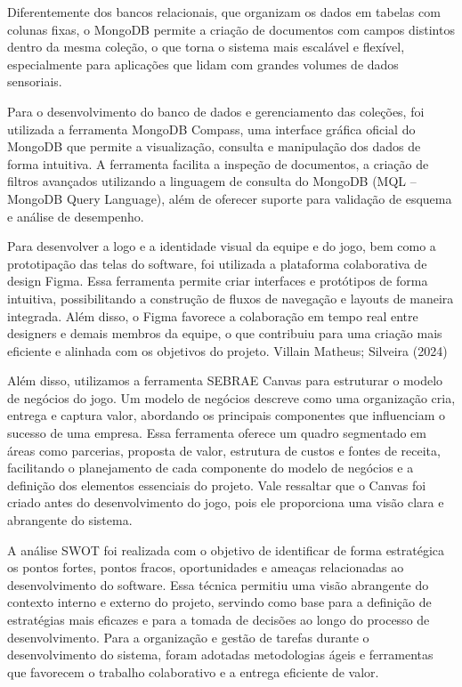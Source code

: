 Diferentemente dos bancos relacionais, que organizam os dados em tabelas com colunas
fixas, o MongoDB permite a criação de documentos com campos distintos dentro da mesma
coleção, o que torna o sistema mais escalável e flexível, especialmente para aplicações que
lidam com grandes volumes de dados sensoriais.

Para o desenvolvimento do banco de dados e gerenciamento das coleções, foi utilizada a
ferramenta MongoDB Compass, uma interface gráfica oficial do MongoDB que permite a
visualização, consulta e manipulação dos dados de forma intuitiva. A ferramenta facilita a
inspeção de documentos, a criação de filtros avançados utilizando a linguagem de consulta
do MongoDB (MQL – MongoDB Query Language), além de oferecer suporte para validação
de esquema e análise de desempenho.

Para desenvolver a logo e a identidade visual da equipe e do jogo, bem como a prototipação
das telas do software, foi utilizada a plataforma colaborativa de design Figma. Essa
ferramenta permite criar interfaces e protótipos de forma intuitiva, possibilitando a
construção de fluxos de navegação e layouts de maneira integrada. Além disso, o Figma
favorece a colaboração em tempo real entre designers e demais membros da equipe, o que
contribuiu para uma criação mais eficiente e alinhada com os objetivos do projeto. Villain
Matheus; Silveira (2024)

Além disso, utilizamos a ferramenta SEBRAE Canvas para estruturar o modelo de negócios do
jogo. Um modelo de negócios descreve como uma organização cria, entrega e captura valor,
abordando os principais componentes que influenciam o sucesso de uma empresa. Essa
ferramenta oferece um quadro segmentado em áreas como parcerias, proposta de valor,
estrutura de custos e fontes de receita, facilitando o planejamento de cada componente do
modelo de negócios e a definição dos elementos essenciais do projeto. Vale ressaltar que o
Canvas foi criado antes do desenvolvimento do jogo, pois ele proporciona uma visão clara e
abrangente do sistema.

A análise SWOT foi realizada com o objetivo de identificar de forma estratégica os pontos
fortes, pontos fracos, oportunidades e ameaças relacionadas ao desenvolvimento do
software. Essa técnica permitiu uma visão abrangente do contexto interno e externo do
projeto, servindo como base para a definição de estratégias mais eficazes e para a tomada
de decisões ao longo do processo de desenvolvimento.
Para a organização e gestão de tarefas durante o desenvolvimento do sistema, foram
adotadas metodologias ágeis e ferramentas que favorecem o trabalho colaborativo e a
entrega eficiente de valor.

